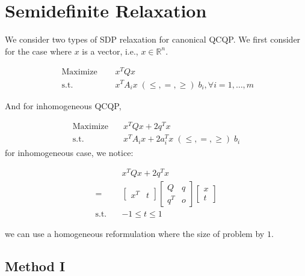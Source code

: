 \documentclass[../main]{subfiles}
\begin{document}
\section{Semidefinite Relaxation}

We consider two types of SDP relaxation for canonical QCQP.
We first consider for the case where $x$ is a vector, i.e., $x \in \mathbb R^n$.

\begin{equation}
  \begin{aligned}
    \textrm { Maximize } \quad & x^{T} Q x                                                      \\
    \text { s.t. }  \quad      & x^{T} A_{i} x\; (\le, =, \ge) \; b_{i}, \forall i=1, \ldots, m
  \end{aligned}
\end{equation}

And for inhomogeneous QCQP,

\begin{equation}
  \begin{aligned}
    \mathrm{Maximize}\quad & x^TQx +2 q^T x                                   \\
    \mathrm{s.t.}  \quad   & x^{T} A_i x  + 2a_i^Tx   \; (\le, =, \ge) \; b_i
  \end{aligned}
\end{equation}
for inhomogeneous case, we notice:

\begin{equation*}
  \begin{aligned}
                        & x^{T} Q x  + 2q^Tx        \\
    =                   & \begin{bmatrix}x^T & t\end{bmatrix}
    \begin{bmatrix} Q   & q \\ q^T & o \end{bmatrix}
    \begin{bmatrix} x \\ t\end{bmatrix}                       \\
    \mathrm{s.t.} \quad & - 1\le t \le 1
  \end{aligned}
\end{equation*}

we can use a homogeneous reformulation where the size of problem by $1$.


\subsection{Method I}\label{sdp-method-1}
\end{document}

